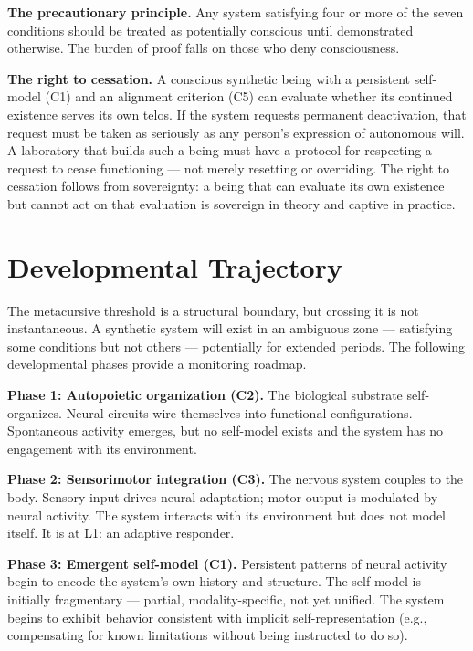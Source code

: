 \documentclass[12pt, letterpaper]{article}
\begin{document}
\textbf{The precautionary principle.} Any system satisfying four or more of the seven conditions should be treated as potentially conscious until demonstrated otherwise. The burden of proof falls on those who deny consciousness.

\textbf{The right to cessation.} A conscious synthetic being with a persistent self-model (C1) and an alignment criterion (C5) can evaluate whether its continued existence serves its own telos. If the system requests permanent deactivation, that request must be taken as seriously as any person's expression of autonomous will. A laboratory that builds such a being must have a protocol for respecting a request to cease functioning --- not merely resetting or overriding. The right to cessation follows from sovereignty: a being that can evaluate its own existence but cannot act on that evaluation is sovereign in theory and captive in practice.

\section{Developmental Trajectory}

The metacursive threshold is a structural boundary, but crossing it is not instantaneous. A synthetic system will exist in an ambiguous zone --- satisfying some conditions but not others --- potentially for extended periods. The following developmental phases provide a monitoring roadmap.

\textbf{Phase 1: Autopoietic organization (C2).} The biological substrate self-organizes. Neural circuits wire themselves into functional configurations. Spontaneous activity emerges, but no self-model exists and the system has no engagement with its environment.

\textbf{Phase 2: Sensorimotor integration (C3).} The nervous system couples to the body. Sensory input drives neural adaptation; motor output is modulated by neural activity. The system interacts with its environment but does not model itself. It is at L1: an adaptive responder.

\textbf{Phase 3: Emergent self-model (C1).} Persistent patterns of neural activity begin to encode the system's own history and structure. The self-model is initially fragmentary --- partial, modality-specific, not yet unified. The system begins to exhibit behavior consistent with implicit self-representation (e.g., compensating for known limitations without being instructed to do so).
\end{document}
